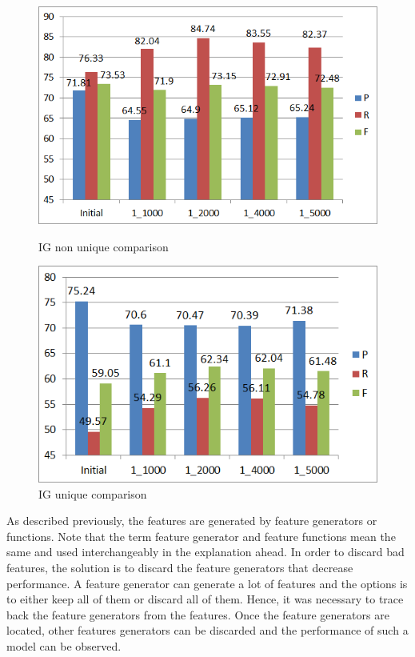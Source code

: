 \begin{figure}
\centering
\begin{minipage}{.5\textwidth}
  \centering
  \includegraphics[width=.95\textwidth]{figures/IGFirst5k_NU.png}
  \caption{IG non unique comparison}
  \label{fig:IG_5k_NU}
\end{minipage}%
\begin{minipage}{.5\textwidth}
  \centering
  \includegraphics[width=.95\textwidth]{figures/IGFirst5k_U.png}
  \caption{IG unique comparison}
  \label{fig:IG_5k_U}
\end{minipage}
\end{figure}


As described previously, the features are generated by feature generators or functions. Note that the term feature generator and feature functions mean the same and used interchangeably in the explanation ahead. In order to discard bad features, the solution is to discard the feature generators that decrease performance. A feature generator can generate a lot of features and the options is to either keep all of them or discard all of them. Hence, it was necessary to trace back the feature generators from the features. Once the feature generators are located, other features generators can be discarded and the performance of such a model can be observed.

